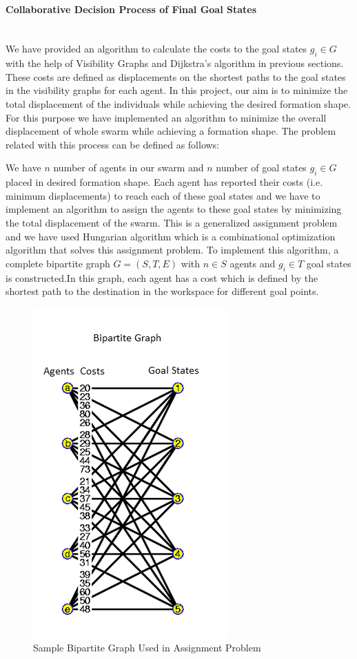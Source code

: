 \paragraph{Collaborative Decision Process of Final Goal States}\hspace{0pt} \\
We have provided an algorithm to calculate the costs to the goal states $g_i \in G$ with the help of Visibility Graphs and Dijkstra's algorithm in previous sections. These costs are defined as displacements on the shortest paths to the goal states in the visibility graphs for each agent. In this project, our aim is to minimize the total displacement of the individuals while achieving the desired formation shape. For this purpose we have implemented an algorithm to minimize the overall displacement of whole swarm while achieving a formation shape. The problem related with this process can be defined as follows:

We have $n$ number of agents in our swarm and $n$ number of goal states $g_i \in G$ placed in desired formation shape. Each agent has reported their costs (i.e. minimum displacements) to reach each of these goal states and we have to implement an algorithm to assign the agents to these goal states by minimizing the total displacement of the swarm. This is a generalized assignment problem and we have used Hungarian algorithm which is a combinational optimization algorithm that solves this assignment problem. To implement this algorithm, a complete bipartite graph $G=(S,T,E)$ with $n \in S$ agents and $g_i \in T$ goal states is constructed.In this graph, each agent has a cost which is defined by the shortest path to the destination in the workspace for different goal points. 

\begin{figure}[H]
\centering
\includegraphics[width=.4\textwidth]{bipartite}
\caption{Sample Bipartite Graph Used in Assignment Problem \cite{102}}
\end{figure}

